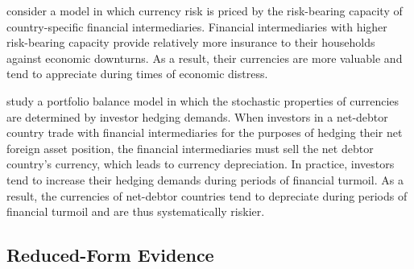 \documentclass{ar-1col}
\begin{document}
\citet{MalamudSchrimpf2020} consider a model in which currency risk is priced by the risk-bearing capacity of country-specific financial intermediaries. Financial intermediaries with higher risk-bearing capacity provide relatively more insurance to their households against economic downturns. As a result, their currencies are more valuable and tend to appreciate during times of economic distress.

\citet{LiaoZhang2020} study a portfolio balance model in which the stochastic properties of currencies are determined by investor hedging demands. When investors in a net-debtor country trade with financial intermediaries for the purposes of hedging their net foreign asset position, the financial intermediaries must sell the net debtor country's currency, which leads to currency depreciation. In practice, investors tend to increase their hedging demands during periods of financial turmoil. As a result, the currencies of net-debtor countries tend to depreciate during periods of financial turmoil and are thus systematically riskier.
 
 



\subsection{Reduced-Form Evidence}
\end{document}
